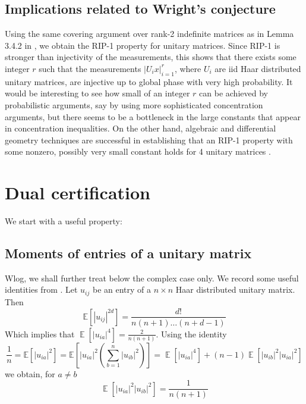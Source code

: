 \documentclass[11pt]{article}
\newcommand{\<}{\langle}
\renewcommand{\>}{\rangle}
\newcommand{\E}{\operatorname{\mathbb{E}}}
\numberwithin{equation}{section}
\begin{document}
 
 \subsection{Implications related to Wright's conjecture}
 Using the same covering argument over rank-2 indefinite matrices as in Lemma 3.4.2 in \cite{CSV}, we obtain the RIP-1 property for unitary matrices. Since RIP-1 is stronger than injectivity of the measurements, this shows that there exists some integer $r$ such that the measurements $|U_i x|_{i=1}^r$, where $U_i$ are iid Haar distributed unitary matrices, are injective up to global phase with very high probability. It would be interesting to see how small of an integer $r$ can be achieved by probabilistic arguments, say by using more sophisticated concentration arguments, but there seems to be a bottleneck in the large constants that appear in concentration inequalities. On the other hand, algebraic and differential geometry techniques are successful in establishing that an RIP-1 property with some nonzero, possibly very small constant holds for 4 unitary matrices \cite{DAP}.
 
 \section{Dual certification}
 We start with a useful property:
\subsection{Moments of entries of a unitary matrix}
Wlog, we shall further treat below the complex case only. We record some useful identities from \cite{One}. Let $u_{ij}$ be an entry of a $n \times n$ Haar distributed unitary matrix. Then
\[
\mathbb{E}[ |u_{ij}|^{2d} ] = \frac{d!}{n(n+1)\ldots(n+d-1)} 
\]
Which implies that $ \E[|u_{ia}|^4] = \frac{2}{n(n+1)}$.
Using the identity 
\[
\frac{1}{n} = \mathbb{E}[|u_{ia}|^2] = \mathbb{E}[|u_{ia}|^2 (\sum_{b=1}^{n} |u_{ib}|^2)] = \E[|u_{ia}|^4] + (n-1)\E[|u_{ib}|^2 |u_{ia}|^2]
\]
we obtain, for $a \neq b$
\[
\E[|u_{ia}|^2 |u_{ib}|^2] = \frac{1}{n(n+1)}
\]

\end{document}
